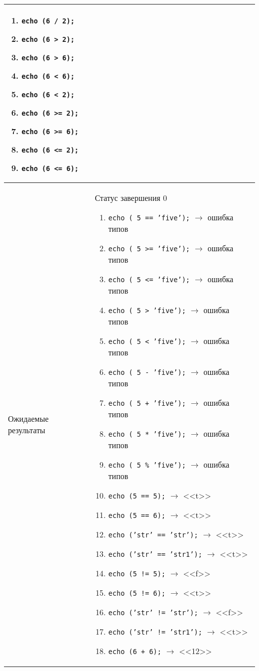 \documentclass[a4paper, 12pt]{article}
\begin{document}
\begin{longtable}[H]{|l|p{4in}|}
\begin{enumerate}
			\item {\tt echo (6 / 2);}
			\item {\tt echo (6 > 2);}
			\item {\tt echo (6 > 6);}
			\item {\tt echo (6 < 6);}
			\item {\tt echo (6 < 2);}
			\item {\tt echo (6 >= 2);}
			\item {\tt echo (6 >= 6);}
			\item {\tt echo (6 <= 2);}
			\item {\tt echo (6 <= 6);}
		\end{enumerate}\\
		\hline
		Ожидаемые результаты	&Статус завершения 0\newline
		\begin{enumerate}
			\item {\tt echo ( 5 == 'five');} $\rightarrow$ ошибка типов
			\item {\tt echo ( 5 >= 'five');} $\rightarrow$ ошибка типов
			\item {\tt echo ( 5 <= 'five');} $\rightarrow$ ошибка типов
			\item {\tt echo ( 5 > 'five');} $\rightarrow$ ошибка типов
			\item {\tt echo ( 5 < 'five');} $\rightarrow$ ошибка типов
			\item {\tt echo ( 5 - 'five');} $\rightarrow$ ошибка типов
			\item {\tt echo ( 5 + 'five');} $\rightarrow$ ошибка типов
			\item {\tt echo ( 5 * 'five');} $\rightarrow$ ошибка типов
			\item {\tt echo ( 5 \% 'five');} $\rightarrow$ ошибка типов
			\item {\tt echo (5 == 5);} $\rightarrow$ <<t>>
			\item {\tt echo (5 == 6);} $\rightarrow$ <<t>>
			\item {\tt echo ('str' == 'str');} $\rightarrow$ <<t>>
			\item {\tt echo ('str' == 'str1');} $\rightarrow$ <<t>>
			\item {\tt echo (5 != 5);} $\rightarrow$ <<f>>
			\item {\tt echo (5 != 6);} $\rightarrow$ <<t>>
			\item {\tt echo ('str' != 'str');} $\rightarrow$ <<f>>
			\item {\tt echo ('str' != 'str1');} $\rightarrow$ <<t>>
			\item {\tt echo (6 + 6);} $\rightarrow$ <<12>>

\end{enumerate}
\end{longtable}
\end{document}
